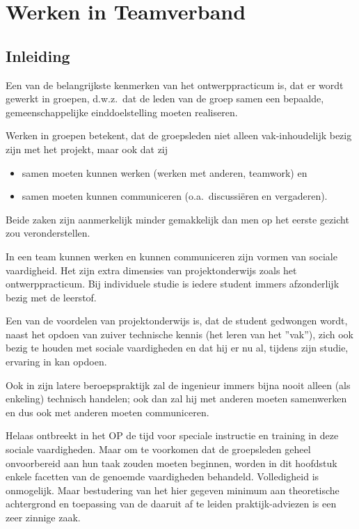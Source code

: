 \section{Werken in Teamverband}

\subsection{Inleiding}

Een van de belangrijkste kenmerken van het ontwerppracticum
is, dat er wordt gewerkt in groepen, d.w.z.\ dat de leden van
de groep samen een bepaalde,
gemeenschappelijke einddoelstelling moeten realiseren.

Werken in groepen betekent, dat de groepsleden niet alleen
vak-inhoudelijk bezig zijn met het projekt, maar ook dat zij
\begin{itemize}
\item
samen moeten kunnen werken (werken met anderen, teamwork) en
\item
samen moeten kunnen communiceren (o.a.\ discussi\"eren en vergaderen).
\end{itemize}
Beide zaken zijn aanmerkelijk minder gemakkelijk dan men op
het eerste gezicht zou veronderstellen.

In een team kunnen werken en kunnen communiceren zijn vormen
van sociale vaardigheid. Het zijn extra dimensies van 
projektonderwijs zoals het ontwerppracticum. 
Bij individuele studie is iedere student immers
afzonderlijk bezig met de leerstof. 

Een van de voordelen van projektonderwijs is, dat de student
gedwongen wordt, naast het opdoen van zuiver technische kennis
(het leren van het ''vak''), zich ook bezig te houden met sociale
 vaardigheden en dat hij er nu al, tijdens zijn studie,
ervaring  in kan opdoen.

Ook in zijn latere beroepspraktijk zal de ingenieur immers
bijna nooit alleen (als enkeling) technisch handelen; ook dan
zal hij met anderen moeten samenwerken en dus ook met anderen
moeten communiceren.

Helaas ontbreekt in het OP de tijd voor speciale instructie en
training in deze sociale vaardigheden. Maar om te voorkomen
dat de groepsleden geheel onvoorbereid aan hun taak
zouden moeten beginnen, worden in dit hoofdstuk enkele facetten van
de genoemde vaardigheden behandeld. Volledigheid is onmogelijk. Maar bestudering van het hier gegeven minimum aan theoretische achtergrond en toepassing van de daaruit af te leiden
praktijk-adviezen is een zeer zinnige zaak.

